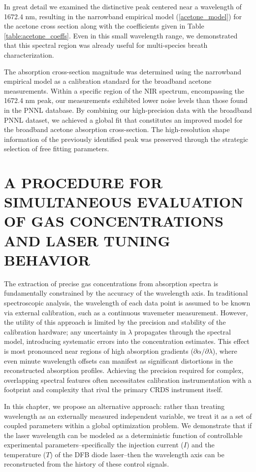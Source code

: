 \documentclass[12pt]{report}
\begin{document}
	In great detail we examined the distinctive peak centered near a wavelength of 1672.4 nm, resulting in the narrowband empirical model (\ref{acetone_model}) for the acetone cross section along with the coefficients given in Table \ref{table:acetone_coeffs}. Even in this small wavelength range, we demonstrated that this spectral region was already useful for multi-species breath characterization.
	
	The absorption cross-section magnitude was determined using the narrowband empirical model as a calibration standard for the broadband acetone measurements. Within a specific region of the NIR spectrum, encompassing the 1672.4 nm peak, our measurements exhibited lower noise levels than those found in the PNNL database. By combining our high-precision data with the broadband PNNL dataset, we achieved a global fit that constitutes an improved model for the broadband acetone absorption cross-section. The high-resolution shape information of the previously identified peak was preserved through the strategic selection of free fitting parameters.
	
	
	\chapter{A PROCEDURE FOR SIMULTANEOUS EVALUATION OF GAS CONCENTRATIONS AND LASER TUNING BEHAVIOR} \label{chap:det}
	The extraction of precise gas concentrations from absorption spectra is fundamentally constrained by the accuracy of the wavelength axis. In traditional spectroscopic analysis, the wavelength of each data point is assumed to be known via external calibration, such as a continuous wavemeter measurement. However, the utility of this approach is limited by the precision and stability of the calibration hardware; any uncertainty in $\lambda$ propagates through the spectral model, introducing systematic errors into the concentration estimates. This effect is most pronounced near regions of high absorption gradients ($\partial\alpha/\partial\lambda$), where even minute wavelength offsets can manifest as significant distortions in the reconstructed absorption profiles. Achieving the precision required for complex, overlapping spectral features often necessitates calibration instrumentation with a footprint and complexity that rival the primary CRDS instrument itself.
	
	In this chapter, we propose an alternative approach: rather than treating wavelength as an externally measured independent variable, we treat it as a set of coupled parameters within a global optimization problem. We demonstrate that if the laser wavelength can be modeled as a deterministic function of controllable experimental parameters--specifically the injection current ($I$) and the temperature ($T$) of the DFB diode laser--then the wavelength axis can be reconstructed from the history of these control signals.
	
\end{document}
